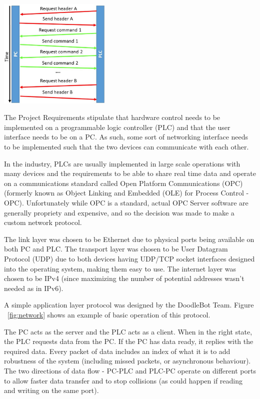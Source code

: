 \begin{center}
	\includegraphics[width=0.4\textwidth]{figures/systemDesign/network.JPG}
	\label{fig:network}
\end{center}

The Project Requirements stipulate that hardware control needs to be implemented on a programmable logic controller (PLC) and that the user interface needs to be on a PC. As such, some sort of networking interface needs to be implemented such that the two devices can communicate with each other. 

In the industry, PLCs are usually implemented in large scale operations with many devices and the requirements to be able to share real time data and operate on a communications standard called Open Platform Communications (OPC) (formerly known as Object Linking and Embedded (OLE) for Process Control - OPC). Unfortunately while OPC is a standard, actual OPC Server software are generally propriety and expensive, and so the decision was made to make a custom network protocol.

The link layer was chosen to be Ethernet due to physical ports being available on both PC and PLC. The transport layer was chosen to be User Datagram Protocol (UDP) due to both devices having UDP/TCP socket interfaces designed into the operating system, making them easy to use. The internet layer was chosen to be IPv4 (since maximizing the number of potential addresses wasn't needed as in IPv6).

A simple application layer protocol was designed by the DoodleBot Team. Figure ~\ref{fig:network} shows an example of basic operation of this protocol. 

The PC acts as the server and the PLC acts as a client. When in the right state, the PLC requests data from the PC. If the PC has data ready, it replies with the required data. Every packet of data includes an index of what it is to add robustness of the system (including missed packets, or asynchronous behaviour). The two directions of data flow - PC-PLC and PLC-PC operate on different ports to allow faster data transfer and to stop collisions (as could happen if reading and writing on the same port).

